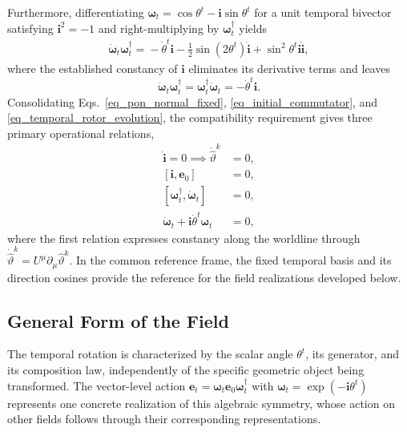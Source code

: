 Furthermore, differentiating $\boldsymbol{\omega}_{t}=\cos\theta^{t}-\mathbf{i}\sin\theta^{t}$ for a unit temporal bivector satisfying $\mathbf{i}^{2}=-1$ and right-multiplying by $\boldsymbol{\omega}_{t}^{\dagger}$ yields
\begin{equation}
\begin{split}
    \dot{\boldsymbol{\omega}}_{t}\boldsymbol{\omega}_{t}^{\dagger}={}-\dot{\theta}^{t}\mathbf{i}-\frac{1}{2}\sin(2\theta^{t})\dot{\mathbf{i}}+\sin^{2}\theta^{t}\mathbf{i}\dot{\mathbf{i}},
\end{split}
\end{equation}
where the established constancy of $\mathbf{i}$ eliminates its derivative terms and leaves
\begin{equation}\label{eq_temporal_rotor_evolution}
    \dot{\boldsymbol{\omega}}_{t}\boldsymbol{\omega}_{t}^{\dagger}=\boldsymbol{\omega}_{t}^{\dagger}\dot{\boldsymbol{\omega}}_{t}=-\dot{\theta}^{t}\mathbf{i}.
\end{equation}
Consolidating Eqs.~\eqref{eq_pon_normal_fixed}, \eqref{eq_initial_commutator}, and \eqref{eq_temporal_rotor_evolution}, the compatibility requirement gives three primary operational relations,
\begin{subequations}\label{eq_spinor_compatibility_relations}
\begin{align}
    \dot{\mathbf{i}}=0\implies\dot{\hat{\vartheta}}^{k}&=0,\label{eq_temporal_generator_constancy}\\
    [\mathbf{i},\mathbf{e}_{0}]&=0,\label{eq_temporal_generator_commutator}\\
    [\boldsymbol{\omega}_{t}^{\dagger},\dot{\boldsymbol{\omega}}_{t}]&=0,\\
    \dot{\boldsymbol{\omega}}_{t}+\mathbf{i}\dot{\theta}^{t}\boldsymbol{\omega}_{t}&=0,\label{eq_temporal_rotor_transport}
\end{align}
\end{subequations}
where the first relation expresses constancy along the worldline through $\dot{\hat{\vartheta}}^{k}=U^{\mu}\partial_{\mu}\hat{\vartheta}^{k}$. In the common reference frame, the fixed temporal basis and its direction cosines provide the reference for the field realizations developed below.

\subsection{General Form of the Field}
The temporal rotation is characterized by the scalar angle $\theta^{t}$, its generator, and its composition law, independently of the specific geometric object being transformed. The vector-level action $\mathbf{e}_{t}=\boldsymbol{\omega}_{t}\mathbf{e}_{0}\boldsymbol{\omega}_{t}^{\dagger}$ with $\boldsymbol{\omega}_{t}=\exp(-\mathbf{i}\theta^{t})$ represents one concrete realization of this algebraic symmetry, whose action on other fields follows through their corresponding representations.

